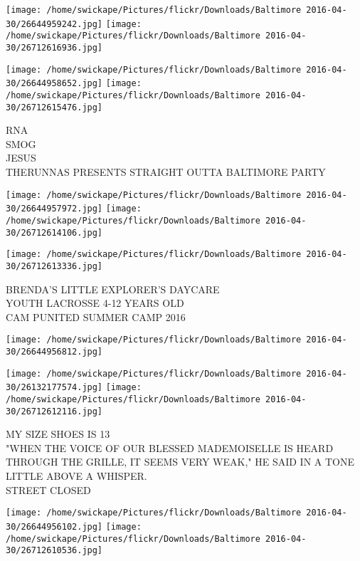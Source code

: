 \documentclass[10pt,letterpaper]{article}
\begin{document}
\texttt{[image: /home/swickape/Pictures/flickr/Downloads/Baltimore 2016-04-30/26644959242.jpg]}
\texttt{[image: /home/swickape/Pictures/flickr/Downloads/Baltimore 2016-04-30/26712616936.jpg]}

\texttt{[image: /home/swickape/Pictures/flickr/Downloads/Baltimore 2016-04-30/26644958652.jpg]}
\texttt{[image: /home/swickape/Pictures/flickr/Downloads/Baltimore 2016-04-30/26712615476.jpg]}

RNA\\
SMOG\\
JESUS\\
THERUNNAS PRESENTS STRAIGHT OUTTA BALTIMORE PARTY\\
\pagebreak

\texttt{[image: /home/swickape/Pictures/flickr/Downloads/Baltimore 2016-04-30/26644957972.jpg]}
\texttt{[image: /home/swickape/Pictures/flickr/Downloads/Baltimore 2016-04-30/26712614106.jpg]}

\texttt{[image: /home/swickape/Pictures/flickr/Downloads/Baltimore 2016-04-30/26712613336.jpg]}

BRENDA'S LITTLE EXPLORER'S DAYCARE\\
YOUTH LACROSSE 4{-}12 YEARS OLD\\
CAM PUNITED SUMMER CAMP 2016\\
\pagebreak

\texttt{[image: /home/swickape/Pictures/flickr/Downloads/Baltimore 2016-04-30/26644956812.jpg]}

\vspace{0.25in}
\texttt{[image: /home/swickape/Pictures/flickr/Downloads/Baltimore 2016-04-30/26132177574.jpg]}
\texttt{[image: /home/swickape/Pictures/flickr/Downloads/Baltimore 2016-04-30/26712612116.jpg]}

MY SIZE SHOES IS 13\\
"WHEN THE VOICE OF OUR BLESSED MADEMOISELLE IS HEARD THROUGH THE GRILLE, IT SEEMS VERY WEAK," HE SAID IN A TONE LITTLE ABOVE A WHISPER.\\
STREET CLOSED\\
\pagebreak

\texttt{[image: /home/swickape/Pictures/flickr/Downloads/Baltimore 2016-04-30/26644956102.jpg]}
\texttt{[image: /home/swickape/Pictures/flickr/Downloads/Baltimore 2016-04-30/26712610536.jpg]}
\end{document}
